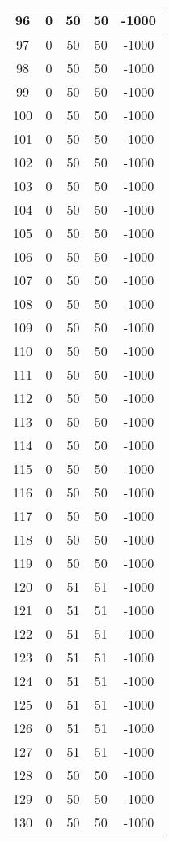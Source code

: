 \documentclass[letterpaper, 12pt]{article}
\begin{document}
\begin{longtable}{|c|c|c|c|c|}
\hline
96 & 0 & 50 & 50 & -1000 \\
\hline
97 & 0 & 50 & 50 & -1000 \\
\hline
98 & 0 & 50 & 50 & -1000 \\
\hline
99 & 0 & 50 & 50 & -1000 \\
\hline
100 & 0 & 50 & 50 & -1000 \\
\hline
101 & 0 & 50 & 50 & -1000 \\
\hline
102 & 0 & 50 & 50 & -1000 \\
\hline
103 & 0 & 50 & 50 & -1000 \\
\hline
104 & 0 & 50 & 50 & -1000 \\
\hline
105 & 0 & 50 & 50 & -1000 \\
\hline
106 & 0 & 50 & 50 & -1000 \\
\hline
107 & 0 & 50 & 50 & -1000 \\
\hline
108 & 0 & 50 & 50 & -1000 \\
\hline
109 & 0 & 50 & 50 & -1000 \\
\hline
110 & 0 & 50 & 50 & -1000 \\
\hline
111 & 0 & 50 & 50 & -1000 \\
\hline
112 & 0 & 50 & 50 & -1000 \\
\hline
113 & 0 & 50 & 50 & -1000 \\
\hline
114 & 0 & 50 & 50 & -1000 \\
\hline
115 & 0 & 50 & 50 & -1000 \\
\hline
116 & 0 & 50 & 50 & -1000 \\
\hline
117 & 0 & 50 & 50 & -1000 \\
\hline
118 & 0 & 50 & 50 & -1000 \\
\hline
119 & 0 & 50 & 50 & -1000 \\
\hline
120 & 0 & 51 & 51 & -1000 \\
\hline
121 & 0 & 51 & 51 & -1000 \\
\hline
122 & 0 & 51 & 51 & -1000 \\
\hline
123 & 0 & 51 & 51 & -1000 \\
\hline
124 & 0 & 51 & 51 & -1000 \\
\hline
125 & 0 & 51 & 51 & -1000 \\
\hline
126 & 0 & 51 & 51 & -1000 \\
\hline
127 & 0 & 51 & 51 & -1000 \\
\hline
128 & 0 & 50 & 50 & -1000 \\
\hline
129 & 0 & 50 & 50 & -1000 \\
\hline
130 & 0 & 50 & 50 & -1000 \\

\end{longtable}
\end{document}
